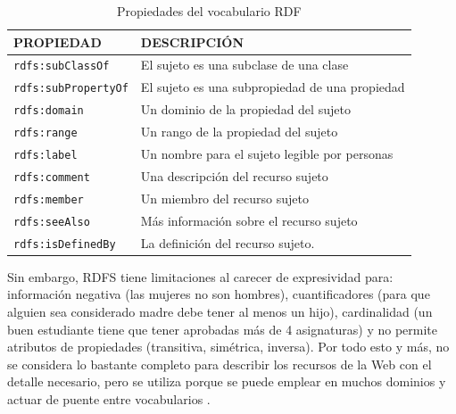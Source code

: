 \begin{table}[H]
	\caption{Propiedades del vocabulario RDF}
	\label{tabla-rdfs2}
	\centering
	\begin{tabular}{|
			>{\columncolor[HTML]{FFFFFF}}l |m{8cm}|}
		\hline
		\cellcolor[HTML]{EFEFEF}\textbf{PROPIEDAD} & \cellcolor[HTML]{EFEFEF} \textbf{DESCRIPCIÓN}\\ \hline
		\texttt{rdfs:subClassOf}                         &         El sujeto es una subclase de una clase                 \\ \hline
		\texttt{rdfs:subPropertyOf}                         &     El sujeto es una subpropiedad de una propiedad                     \\ \hline
		\texttt{rdfs:domain}                         &           Un dominio de la propiedad del sujeto               \\ \hline
		\texttt{rdfs:range}                         &        Un rango de la propiedad del sujeto                  \\ \hline
		\texttt{rdfs:label}                         &        Un nombre para el sujeto legible por personas                   \\ \hline
		\texttt{rdfs:comment}                         &        Una descripción del recurso sujeto                  \\ \hline
		\texttt{rdfs:member}                         &        Un miembro del recurso sujeto                  \\ \hline
		\texttt{rdfs:seeAlso}                         &              Más información sobre el recurso sujeto            \\ \hline
		\texttt{rdfs:isDefinedBy}                         &       La definición del recurso sujeto. 
		\\ \hline
	\end{tabular}
\end{table}

Sin embargo, RDFS tiene limitaciones al carecer de expresividad para: información negativa (las mujeres no son hombres), cuantificadores (para que alguien sea considerado madre debe tener al menos un hijo), cardinalidad (un buen estudiante tiene que tener aprobadas más de 4 asignaturas) y no permite atributos de propiedades (transitiva, simétrica, inversa). Por todo esto y más, no se considera lo bastante completo para describir los recursos de la Web con el detalle necesario, pero se utiliza porque se puede emplear en muchos dominios y actuar de puente entre vocabularios \cite{aplicacion}.


